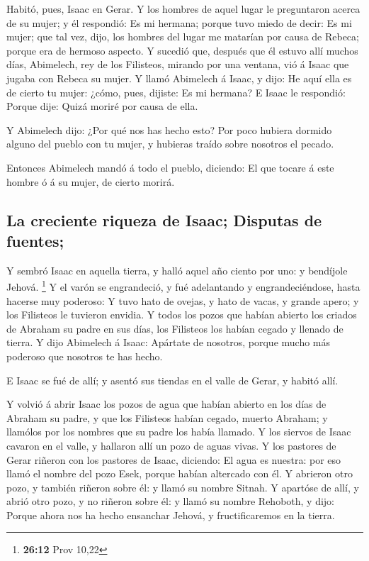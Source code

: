  Habitó, pues, Isaac en Gerar.  Y los
hombres de aquel lugar le preguntaron acerca de su mujer; y él
respondió: Es mi hermana; porque tuvo miedo de decir: Es mi mujer; que
tal vez, dijo, los hombres del lugar me matarían por causa de Rebeca;
porque era de hermoso aspecto.  Y sucedió que, después que
él estuvo allí muchos días, Abimelech, rey de los Filisteos, mirando por
una ventana, vió á Isaac que jugaba con Rebeca su mujer. 
Y llamó Abimelech á Isaac, y dijo: He aquí ella es de cierto tu mujer:
¿cómo, pues, dijiste: Es mi hermana? E Isaac le respondió: Porque dije:
Quizá moriré por causa de ella.

 Y Abimelech dijo: ¿Por qué nos has hecho esto? Por poco
hubiera dormido alguno del pueblo con tu mujer, y hubieras traído sobre
nosotros el pecado.

 Entonces Abimelech mandó á todo el pueblo, diciendo: El
que tocare á este hombre ó á su mujer, de cierto morirá.

\hypertarget{la-creciente-riqueza-de-isaac-disputas-de-fuentes}{%
\subsection{La creciente riqueza de Isaac; Disputas de
fuentes;}\label{la-creciente-riqueza-de-isaac-disputas-de-fuentes}}

 Y sembró Isaac en aquella tierra, y halló aquel año
ciento por uno: y bendíjole Jehová. \footnote{\textbf{26:12} Prov 10,22}
 Y el varón se engrandeció, y fué adelantando y
engrandeciéndose, hasta hacerse muy poderoso:  Y tuvo
hato de ovejas, y hato de vacas, y grande apero; y los Filisteos le
tuvieron envidia.  Y todos los pozos que habían abierto
los criados de Abraham su padre en sus días, los Filisteos los habían
cegado y llenado de tierra.  Y dijo Abimelech á Isaac:
Apártate de nosotros, porque mucho más poderoso que nosotros te has
hecho.

 E Isaac se fué de allí; y asentó sus tiendas en el valle
de Gerar, y habitó allí.

 Y volvió á abrir Isaac los pozos de agua que habían
abierto en los días de Abraham su padre, y que los Filisteos habían
cegado, muerto Abraham; y llamólos por los nombres que su padre los
había llamado.  Y los siervos de Isaac cavaron en el
valle, y hallaron allí un pozo de aguas vivas.  Y los
pastores de Gerar riñeron con los pastores de Isaac, diciendo: El agua
es nuestra: por eso llamó el nombre del pozo Esek, porque habían
altercado con él.  Y abrieron otro pozo, y también
riñeron sobre él: y llamó su nombre Sitnah.  Y apartóse
de allí, y abrió otro pozo, y no riñeron sobre él: y llamó su nombre
Rehoboth, y dijo: Porque ahora nos ha hecho ensanchar Jehová, y
fructificaremos en la tierra.

